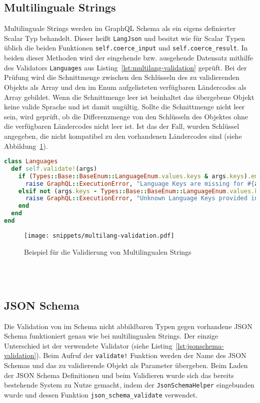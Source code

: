 \subsection{Multilinguale Strings}
\label{graphql:validation:multi}
Multilinguale Strings werden im GraphQL Schema als ein eigens definierter Scalar Typ behandelt.
Dieser heißt \texttt{LangJson} und besitzt wie für Scalar Typen üblich die beiden Funktionen \texttt{self.coerce\_input} und \texttt{self.coerce\_result}. In beiden dieser Methoden wird der eingehende bzw. ausgehende Datensatz mithilfe des Validators \texttt{Languages} aus Listing~\ref{lst:multilang-validation} geprüft. 
Bei der Prüfung wird die Schnittmenge zwischen den Schlüsseln des zu validierenden Objekts als Array und den im Enum aufgelisteten verfügbaren Ländercodes als Array gebildet. Wenn die Schnittmenge leer ist beinhaltet das übergebene Objekt keine valide Sprache und ist damit ungültig. Sollte die Schnittmenge nicht leer sein, wird geprüft, ob die Differenzmenge von den Schlüsseln des Objektes ohne die verfügbaren Ländercodes nicht leer ist. Ist das der Fall, wurden Schlüssel angegeben, die nicht kompatibel zu den vorhandenen Ländercodes sind (siehe Abbildung~\ref{req:typesafe:example}). 

\begin{lstlisting}[language=Ruby,float=h!,caption={Validator Klasse zum Prüfen, ob der übergebene Parameter die Beschaffenheit eines multilingualen Strings aufweist. \lstinline|/graphql/validators/languages.rb|}, label={lst:multilang-validation}]
class Languages
  def self.validate!(args)
    if (Types::Base::BaseEnum::LanguageEnum.values.keys & args.keys).empty?
      raise GraphQL::ExecutionError, "Language Keys are missing for #{args}"
    elsif not (args.keys - Types::Base::BaseEnum::LanguageEnum.values.keys).empty?
      raise GraphQL::ExecutionError, "Unknown Language Keys provided in #{args}"
    end
  end
end
\end{lstlisting}

\begin{figure}[h!]
    \centering
    \texttt{[image: snippets/multilang-validation.pdf]}
    \caption{Beispiel für die Validierung von Multilingualen Strings}
    \label{req:typesafe:example}
\end{figure}

\ \\
\ \\

\subsection{JSON Schema}
Die Validation von im Schema nicht abbildbaren Typen gegen vorhandene JSON Schema funktioniert genau wie bei multilingualen Strings. Der einzige Unterschied ist der verwendete Validator (siehe Listing~\ref{lst:jsonschema-validation}). Beim Aufruf der \texttt{validate!} Funktion werden der Name des JSON Schemas und das zu validierende Objekt  als Parameter übergeben. Beim Laden der JSON Schema Definitionen und beim Validieren wurde sich das bereits bestehende System zu Nutze gemacht, indem der \texttt{JsonSchemaHelper} eingebunden wurde und dessen Funktion \texttt{json\_schema\_validate} verwendet. 

